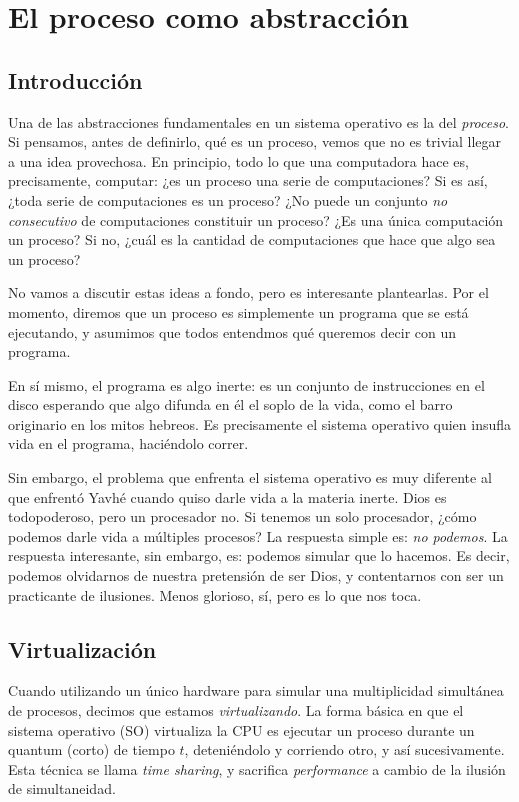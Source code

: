 \documentclass[a4paper, 12pt]{article}
\begin{document}
    
\section{El proceso como abstracción}

\subsection{Introducción}

Una de las abstracciones fundamentales en un sistema operativo es la del
\textit{proceso}. Si pensamos, antes de definirlo, qué es un proceso, vemos que
no es trivial llegar a una idea provechosa. En principio, todo lo que una
computadora hace es, precisamente, computar: ¿es un proceso una serie de
computaciones? Si es así, ¿toda serie de computaciones es un proceso? ¿No puede
un conjunto \textit{no consecutivo} de computaciones constituir un proceso? ¿Es
una única computación un proceso? Si no, ¿cuál es la cantidad de computaciones
que hace que algo sea un proceso?

No vamos a discutir estas ideas a fondo, pero es interesante plantearlas.
Por el momento, diremos que un proceso es simplemente un programa que se 
está ejecutando, y asumimos que todos entendmos qué queremos decir con un 
programa.

En sí mismo, el programa es algo inerte: es un conjunto de instrucciones en el
disco esperando que algo difunda en él el soplo de la vida, como el barro
originario en los mitos hebreos. Es precisamente el sistema operativo quien 
insufla vida en el programa, haciéndolo correr.

Sin embargo, el problema que enfrenta el sistema operativo es muy diferente al
que enfrentó Yavhé cuando quiso darle vida a la materia inerte. Dios es
todopoderoso, pero un procesador no. Si tenemos un solo procesador, ¿cómo
podemos darle vida a múltiples procesos? La respuesta simple es: \textit{no
podemos}. La respuesta interesante, sin embargo, es: podemos simular que lo
hacemos. Es decir, podemos olvidarnos de nuestra pretensión de ser Dios, y 
contentarnos con ser un practicante de ilusiones. Menos glorioso, sí, pero 
es lo que nos toca.

\subsection{Virtualización}

Cuando utilizando un único hardware para simular una multiplicidad simultánea
de procesos, decimos que estamos \textit{virtualizando}. La forma básica en que
el sistema operativo (SO) virtualiza la CPU es ejecutar un proceso durante un
quantum (corto) de tiempo $t$, deteniéndolo y corriendo otro, y así
sucesivamente. Esta técnica se llama \textit{time sharing}, y sacrifica
\textit{performance} a cambio de la ilusión de simultaneidad.  
\end{document}
